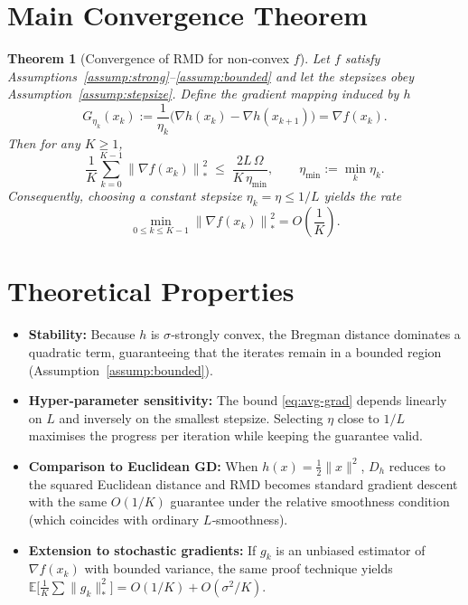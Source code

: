\documentclass{article}
\newtheorem{theorem}{Theorem}
\newcommand{\norm}[1]{\left\|#1\right\|}
\newcommand{\grad}{\nabla}
\begin{document}
\section*{Main Convergence Theorem}
\begin{theorem}[Convergence of RMD for non‑convex $f$]
\label{thm:main}
Let $f$ satisfy Assumptions~\ref{assump:strong}–\ref{assump:bounded} and let the stepsizes obey Assumption~\ref{assump:stepsize}.  
Define the \emph{gradient mapping} induced by $h$
\[
G_{\eta_k}(x_k):=\frac{1}{\eta_k}\big(\grad h(x_k)-\grad h(x_{k+1})\big)=\grad f(x_k).
\]
Then for any $K\ge 1$,
\begin{equation}
\label{eq:avg-grad}
\frac{1}{K}\sum_{k=0}^{K-1}\norm{ \grad f(x_k)}_{*}^{2}
\;\le\;
\frac{2L\,\Omega}{K\,\eta_{\min}},
\qquad 
\eta_{\min}:=\min_{k}\eta_k .
\end{equation}
Consequently, choosing a constant stepsize $\eta_k=\eta\le 1/L$ yields the rate
\[
\min_{0\le k\le K-1}\norm{ \grad f(x_k)}_{*}^{2}
= O\!\left(\frac{1}{K}\right).
\]
\end{theorem}

\section*{Theoretical Properties}
\begin{itemize}
\item \textbf{Stability:} Because $h$ is $\sigma$‑strongly convex, the Bregman distance dominates a quadratic term, guaranteeing that the iterates remain in a bounded region (Assumption~\ref{assump:bounded}).

\item \textbf{Hyper‑parameter sensitivity:} The bound \eqref{eq:avg-grad} depends linearly on $L$ and inversely on the smallest stepsize. Selecting $\eta$ close to $1/L$ maximises the progress per iteration while keeping the guarantee valid.

\item \textbf{Comparison to Euclidean GD:} When $h(x)=\frac12\|x\|^{2}$, $D_h$ reduces to the squared Euclidean distance and RMD becomes standard gradient descent with the same $O(1/K)$ guarantee under the relative smoothness condition (which coincides with ordinary $L$‑smoothness).

\item \textbf{Extension to stochastic gradients:} If $g_k$ is an unbiased estimator of $\grad f(x_k)$ with bounded variance, the same proof technique yields $\mathbb{E}\big[\frac1K\sum\|g_k\|_*^2\big]=O(1/K)+O(\sigma^2/K)$.
\end{itemize}
\end{document}
